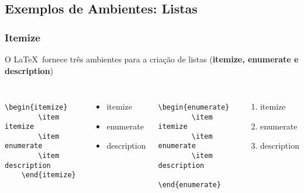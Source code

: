 \subsection*{Exemplos de Ambientes: Listas} %

\subsubsection*{Itemize} %
\label{ssub:itemize}

\begin{frame}[fragile]
O \LaTeX~fornece três ambientes para a criação de listas ({\bf itemize, enumerate e description})


\begin{columns}
\column[t]{6cm}
\begin{verbatim}
    \begin{itemize}
        \item itemize
        \item enumerate
        \item description
    \end{itemize}
\end{verbatim}
\begin{itemize}
    \item itemize
    \item enumerate
    \item description
\end{itemize}
\column[t]{6cm}
\begin{verbatim}
    \begin{enumerate}
        \item itemize
        \item enumerate
        \item description
    \end{enumerate}
\end{verbatim}
\begin{enumerate}
\item itemize
\item enumerate
\item description
\end{enumerate}

\end{columns}
\end{frame}


